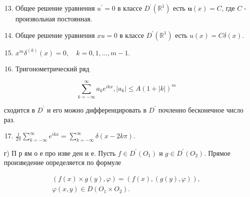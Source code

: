 \documentclass[10pt]{article}
\begin{document}
\begin{enumerate}

  \setcounter{enumi}{12}

  \item Общее решение уравнения $u^{\prime}=0$ в классе $D^{\prime}\left(\mathbb{R}^{1}\right)$ есть $\boldsymbol{u}(x)=C$, где $C$ - произвольная постоянная.



  \item Общее решение уравнения $x u=0$ в классе $D^{\prime}\left(\mathbb{R}^{1}\right)$ есть $u(x)=C \delta(x)$.



  \item $x^{m} \delta^{(k)}(x)=0, \quad k=0,1, \ldots, m-1$.



  \item Тригонометрический ряд



\end{enumerate}



\[

\sum_{k=-\infty}^{\infty} a_{k} e^{i k x},\left|a_{k}\right| \leqslant A(1+|k|)^{m}

\]



сходится в $D^{\prime}$ и его можно дифференцировать в $D^{\prime}$ почленно бесконечное число раз.



\begin{enumerate}

  \setcounter{enumi}{16}

  \item $\frac{1}{2 \pi} \sum_{k=-\infty}^{\infty} e^{i k x}=\sum_{k=-\infty}^{\infty} \delta(x-2 k \pi)$.

\end{enumerate}



г) П р ям о е про изве ден и е. Пусть $f \in D^{\prime}\left(O_{1}\right)$ и $g \in D^{\prime}\left(O_{2}\right)$. Прямое произведение определяется по формуле



\[

\begin{gathered}

(f(x) \times g(y), \varphi)=(f(x),(g(y), \varphi)), \\

\varphi(x, y) \in D\left(O_{1} \times O_{2}\right) .

\end{gathered}

\]
\end{document}
